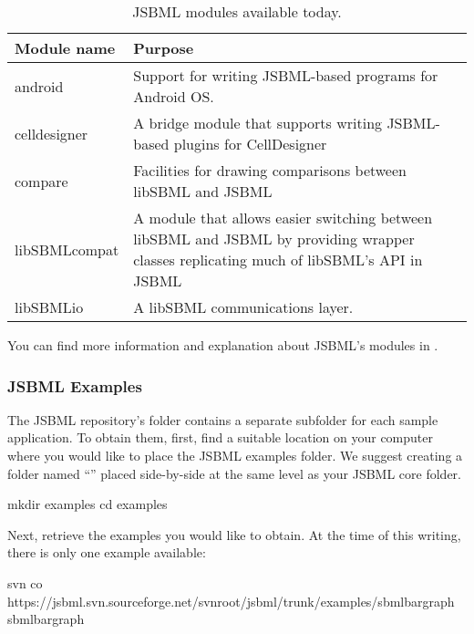 \begin{table}[bh]
  \caption{JSBML modules available today.}
  \label{tab:jsbml-modules}
  \centering
  \begin{tabular}{>{\ttfamily}lp{5.25in}}
    \toprule
    \textbf{\sffamily Module name} & \textbf{Purpose} \\
    \midrule
    android
    & Support for writing JSBML-based programs for Android OS.
    \\
    celldesigner
    & A bridge module that supports writing JSBML-based
    plugins for CellDesigner~\cite{Funahashi2003}
    \\
    compare
    & Facilities for drawing comparisons between libSBML and JSBML
    \\
    libSBMLcompat
    & A module that allows easier switching between libSBML and JSBML by
    providing wrapper classes replicating much of libSBML's API in JSBML
    \\
    libSBMLio
    & A libSBML communications layer.
    \\
    \bottomrule
  \end{tabular}
\end{table}

You can find more information and explanation about JSBML's modules in .


\subsubsection{JSBML Examples}
\label{sec:jsbml-repo-examples}

The JSBML repository's  folder contains a separate
subfolder for each sample application.  To obtain them, first, find a
suitable location on your computer where you would like to place the JSBML
examples folder.  We suggest creating a folder named ``''
placed side-by-side at the same level as your JSBML core folder.

\begin{example}[style=bash, title={Creating a folder for the examples.}]
mkdir examples
cd examples
\end{example}

Next, retrieve the examples you would like to obtain.  At the time of this
writing, there is only one example available:

\begin{example}[style=bash, title={Retrieving the \emph{SBML Bar Graph}
    example application.}] 
svn co https://jsbml.svn.sourceforge.net/svnroot/jsbml/trunk/examples/sbmlbargraph sbmlbargraph
\end{example}


